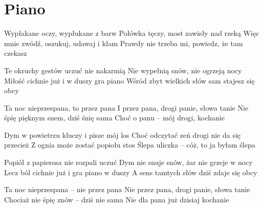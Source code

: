 \section{Piano}
\begin{text}
Wypłakane oczy, wypłukane z barw
Połówka tęczy, most zawisły nad rzeką
Więc mnie zwódź, oszukuj, udawaj i kłam
Prawdy nie trzeba mi, powiedz, że tam czekasz

Te okruchy gestów uczuć nie nakarmią
Nie wypełnią snów, nie ogrzeją nocy
Miłość cichnie już i w duszy gra piano
Wśród zbyt wielkich słów sam stajesz się obcy

Ta noc nieprzespana, to przez pana
I przez pana, drogi panie, słowa tanie
Nie śpię pięknym snem, dziś śnię sama
Choć o panu – mój drogi, kochanie

Dym w powietrzu kluczy i pisze mój los
Choć odczytać zeń drogi nie da się przecież
Z ognia może zostać popiołu stos
Ślepa uliczka – cóż, to ja byłam ślepa

Popiół z papierosa nie rozpali uczuć
Dym nie snuje snów, żar nie grzeje w nocy
Lecz ból cichnie już i gra piano w duszy
A sens tamtych słów dziś zdaje się obcy

Ta noc nieprzespana – nie przez pana
Nie przez pana, drogi panie, słowa tanie
Chociaż nie śpię znów – dziś nie sama
Nie dla pana już dzisiaj kochanie
\end{text}